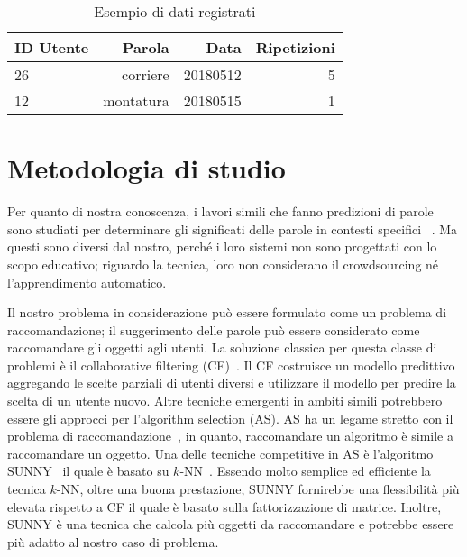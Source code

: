 \documentclass{article}
\begin{document}
\begin{table}
\centering
\begin{tabular}{lrrr}  
\toprule
ID Utente  & Parola & Data & Ripetizioni \\
\midrule
26       & corriere  & 20180512 & 5      \\
12       & montatura  & 20180515 & 1      \\
\bottomrule
\end{tabular}
\caption{Esempio di dati registrati}
\label{tab:esempiodata}
\end{table}

\section{Metodologia di studio}
Per quanto di nostra conoscenza, i lavori simili che fanno predizioni di parole sono studiati per determinare gli significati delle parole in contesti specifici ~\cite{kay2010contextual,bower2011context,zaenen1997context}. Ma questi sono diversi dal nostro, perch\'e i loro sistemi non sono progettati con lo scopo educativo; riguardo la tecnica, loro non considerano il crowdsourcing n\'e l'apprendimento automatico. 

Il nostro problema in considerazione pu\`o essere formulato come un problema di raccomandazione; il suggerimento delle parole pu\`o essere considerato come raccomandare gli oggetti agli utenti. La soluzione classica per questa classe di problemi \`e il collaborative filtering (CF)~\cite{ricci2011introduction,herlocker1999algorithmic}. Il CF costruisce un modello predittivo aggregando le scelte parziali di utenti diversi e utilizzare il modello per predire la scelta di un utente nuovo. Altre tecniche emergenti in ambiti simili potrebbero essere gli approcci per l'algorithm selection (AS). AS ha un legame stretto con il problema di raccomandazione~\cite{misir2017alors}, in quanto, raccomandare un algoritmo è simile a raccomandare un oggetto. Una delle tecniche competitive in AS è l'algoritmo SUNNY~\cite{amadini2015sunny,amadini2015feature,liu2017sunny} il quale è basato su $k$-NN~\cite{altman1992introduction}. Essendo molto semplice ed efficiente la tecnica $k$-NN, oltre una buona prestazione, SUNNY fornirebbe una flessibilità più elevata rispetto a CF il quale è basato sulla fattorizzazione di matrice.
Inoltre, SUNNY è una tecnica che calcola più oggetti da raccomandare e potrebbe essere più adatto al nostro caso di problema.
\end{document}

